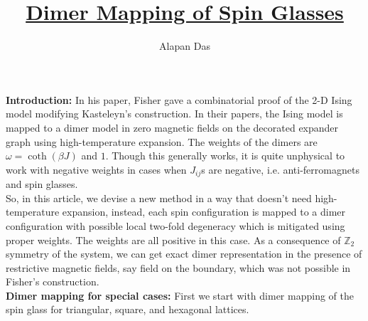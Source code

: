 \documentclass{article}
\title{\underline {\textbf{Dimer Mapping of Spin Glasses}}}
\author{Alapan Das}
\date{}%
\begin{document}
	
	\textbf{Introduction:} In his paper, Fisher gave a combinatorial proof of the 2-D Ising model modifying Kasteleyn's construction. In their papers, the Ising model is mapped to a dimer model in zero magnetic fields on the decorated expander graph using high-temperature expansion. The weights of the dimers are $\omega=\coth(\beta J)$ and $1$. Though this generally works, it is quite unphysical to work with negative weights in cases when $J_{ij}$s are negative, i.e. anti-ferromagnets and spin glasses. \\
	
	So, in this article, we devise a new method in a way that doesn't need high-temperature expansion, instead, each spin configuration is mapped to a dimer configuration with possible local two-fold degeneracy which is mitigated using proper weights. The weights are all positive in this case. As a consequence of $\mathbb Z_2$ symmetry of the system, we can get exact dimer representation in the presence of restrictive magnetic fields, say field on the boundary, which was not possible in Fisher's construction. \\
	
	\textbf{Dimer mapping for special cases:} First we start with dimer mapping of the spin glass for triangular, square, and hexagonal lattices. 
	
\end{document}
